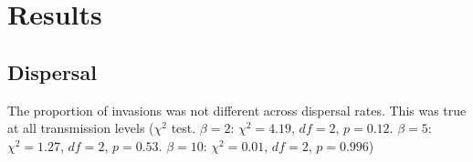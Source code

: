 
\clearpage
\section{Results}





\subsection{Dispersal}


The proportion of invasions was not different across dispersal rates. 
This was true at all transmission levels ($\chi^2$ test. $\beta = 2$: $\chi^2 = 4.19$, $df = 2$, $p = 0.12$. $\beta = 5$: $\chi^2 = 1.27$, $df = 2$, $p = 0.53$. $\beta = 10$: $\chi^2 = 0.01$, $df = 2$, $p = 0.996$)


